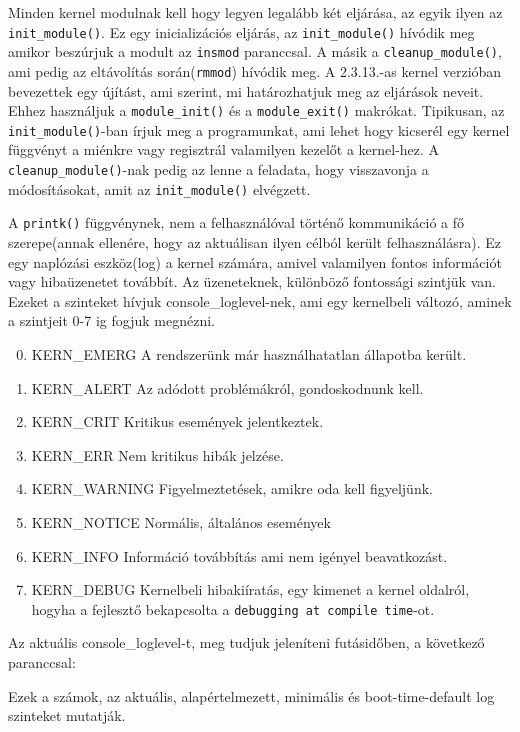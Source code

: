 Minden kernel modulnak kell hogy legyen legalább két eljárása, az egyik ilyen az \texttt{init\_module()}.
Ez egy inicializációs eljárás, az \texttt{init\_module()} hívódik meg amikor beszúrjuk a modult az \texttt{insmod} paranccsal.
A másik a \texttt{cleanup\_module()}, ami pedig az eltávolítás során(\texttt{rmmod}) hívódik meg.
A 2.3.13.-as kernel verzióban bevezettek egy újítást, ami szerint, mi határozhatjuk meg az eljárások neveit. Ehhez használjuk a \texttt{module\_init()} és a \texttt{module\_exit()} makrókat. Tipikusan, az \texttt{init\_module()}-ban írjuk meg a programunkat, ami lehet hogy kicserél egy kernel függvényt a miénkre vagy regisztrál valamilyen kezelőt a kernel-hez. A \texttt{cleanup\_module()}-nak pedig az lenne a feladata, hogy visszavonja a módosításokat, amit az \texttt{init\_module()} elvégzett.

A \texttt{printk()} függvénynek, nem a felhasználóval történő kommunikáció a fő szerepe(annak ellenére, hogy az aktuálisan ilyen célból került felhasználásra). Ez egy naplózási eszköz(log) a kernel számára, amivel valamilyen fontos információt vagy hibaüzenetet továbbít. Az üzeneteknek, különböző fontossági szintjük van. Ezeket a szinteket hívjuk console\_loglevel-nek, ami egy kernelbeli változó, aminek a szintjeit 0-7 ig fogjuk megnézni. 
\begin{enumerate}
\setcounter{enumi}{-1}
	\item KERN\_EMERG \- A rendszerünk már használhatatlan állapotba került.
	\item KERN\_ALERT \- Az adódott problémákról, gondoskodnunk kell.
	\item KERN\_CRIT \- Kritikus események jelentkeztek.
	\item KERN\_ERR \- Nem kritikus hibák jelzése.
	\item KERN\_WARNING	\- Figyelmeztetések, amikre oda kell figyeljünk.
	\item KERN\_NOTICE \- Normális, általános események
	\item KERN\_INFO \- Információ továbbítás ami nem igényel beavatkozást.
	\item KERN\_DEBUG \- Kernelbeli hibakiíratás, egy kimenet a kernel oldalról, hogyha a fejlesztő bekapcsolta a \texttt{debugging at compile time}-ot.
\end{enumerate}
Az aktuális console\_loglevel-t, meg tudjuk jeleníteni futásidőben, a következő paranccsal:
Ezek a számok, az aktuális, alapértelmezett, minimális és boot-time-default log szinteket mutatják.